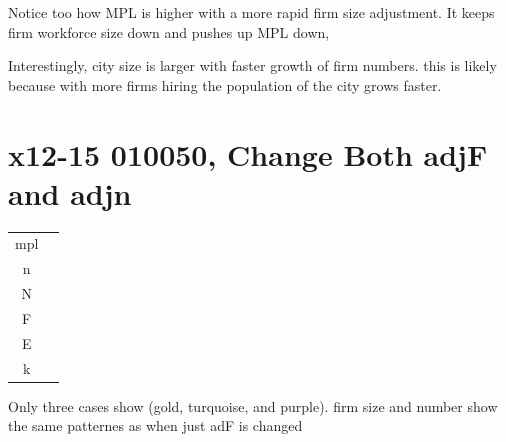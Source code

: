 \documentclass{article}
\begin{document}
Notice too how MPL  is higher with a more rapid firm size adjustment. It keeps  firm workforce size down and pushes up MPL down, 

  Interestingly, city size is larger with faster growth of firm numbers. this is likely because with more firms hiring the population of the city grows faster.

\newpage


 \section{x12-15 010050, Change  Both adjF and adjn}
\begin{multicols}{2}
\begin{tabular}{c|c}
  mpl  &  \\
  n   &  \\
  N   &  \\
  F   &  \\
  E   &  \\
  k   & 
\end{tabular} 
Only three cases show (gold, turquoise, and purple). firm size and number show the same patternes as when just adF is changed 
\end{multicols}
\end{document}
